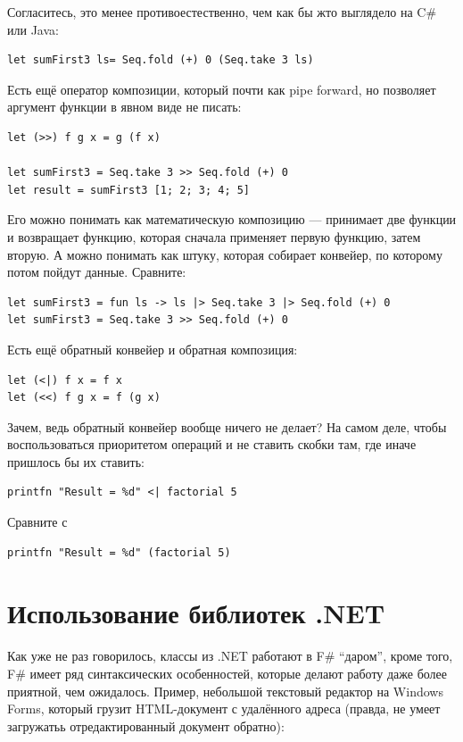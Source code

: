 \documentclass[a5paper]{article}
\begin{document}
Согласитесь, это менее противоестественно, чем как бы жто выглядело на C\# или Java:

\begin{verbatim}
let sumFirst3 ls= Seq.fold (+) 0 (Seq.take 3 ls)
\end{verbatim}

Есть ещё оператор композиции, который почти как pipe forward, но позволяет аргумент функции в явном виде не писать:

\begin{verbatim}
let (>>) f g x = g (f x)

let sumFirst3 = Seq.take 3 >> Seq.fold (+) 0
let result = sumFirst3 [1; 2; 3; 4; 5]
\end{verbatim}

Его можно понимать как математическую композицию --- принимает две функции и возвращает функцию, которая сначала применяет первую функцию, затем вторую. А можно понимать как штуку, которая собирает конвейер, по которому потом пойдут данные. Сравните: 

\begin{verbatim}
let sumFirst3 = fun ls -> ls |> Seq.take 3 |> Seq.fold (+) 0
let sumFirst3 = Seq.take 3 >> Seq.fold (+) 0
\end{verbatim}

Есть ещё обратный конвейер и обратная композиция:

\begin{verbatim}
let (<|) f x = f x
let (<<) f g x = f (g x)
\end{verbatim}

Зачем, ведь обратный конвейер вообще ничего не делает? На самом деле, чтобы воспользоваться приоритетом операций и не ставить скобки там, где иначе пришлось бы их ставить:

\begin{verbatim}
printfn "Result = %d" <| factorial 5
\end{verbatim}

Сравните с

\begin{verbatim}
printfn "Result = %d" (factorial 5)
\end{verbatim}

\section{Использование библиотек .NET}

Как уже не раз говорилось, классы из .NET работают в F\# ``даром'', кроме того, F\# имеет ряд синтаксических особенностей, которые делают работу даже более приятной, чем ожидалось. Пример, небольшой текстовый редактор на Windows Forms, который грузит HTML-документ с удалённого адреса (правда, не умеет загружатьь отредактированный документ обратно):
\end{document}
